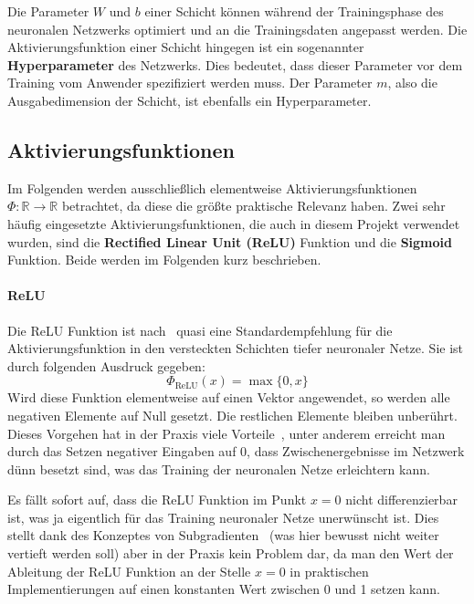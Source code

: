 Die Parameter $W$ und $b$ einer Schicht k\"onnen w\"ahrend der Trainingsphase
des neuronalen Netzwerks optimiert und an die Trainingsdaten
angepasst werden.
Die Aktivierungsfunktion einer Schicht hingegen ist ein sogenannter
\textbf{Hyperparameter} des Netzwerks. Dies bedeutet, dass dieser
Parameter vor dem Training vom Anwender spezifiziert werden muss.
Der Parameter $m$, also die Ausgabedimension der Schicht, ist ebenfalls
ein Hyperparameter.

\subsection{Aktivierungsfunktionen}

Im Folgenden werden ausschlie{\ss}lich elementweise Aktivierungsfunktionen
$\Phi: \mathbb{R} \rightarrow \mathbb{R}$ betrachtet,
da diese die gr\"o{\ss}te praktische Relevanz haben.
Zwei sehr h\"aufig eingesetzte Aktivierungsfunktionen, die auch in diesem
Projekt verwendet wurden, sind die \textbf{Rectified Linear Unit (ReLU)}
Funktion und die \textbf{Sigmoid} Funktion.
Beide werden im Folgenden kurz beschrieben.

\paragraph{ReLU}

Die ReLU Funktion ist nach~\cite{glorot} quasi eine
Standardempfehlung f\"ur die Aktivierungsfunktion in den
versteckten Schichten tiefer neuronaler Netze.
Sie ist durch folgenden Ausdruck gegeben:
\begin{equation*}
    \Phi_\text{ReLU}(x) = \max \{ 0, x \}
\end{equation*}
Wird diese Funktion elementweise auf einen Vektor angewendet, so werden
alle negativen Elemente auf Null gesetzt. Die restlichen Elemente bleiben
unber\"uhrt.
Dieses Vorgehen hat in der Praxis viele Vorteile~\cite{glorot}, unter
anderem erreicht man durch das Setzen negativer Eingaben auf 0,
dass Zwischenergebnisse im Netzwerk d\"unn besetzt sind, was das Training
der neuronalen Netze erleichtern kann.

Es f\"allt sofort auf, dass die ReLU Funktion im Punkt $x=0$ nicht
differenzierbar ist, was ja eigentlich f\"ur das Training neuronaler
Netze unerw\"unscht ist.
Dies stellt dank des Konzeptes von Subgradienten~\cite{understanding_ml}
(was hier bewusst nicht weiter vertieft werden soll)
aber in der Praxis kein Problem dar, da man den Wert der Ableitung der ReLU Funktion
an der Stelle $x=0$ in praktischen Implementierungen auf einen konstanten
Wert zwischen 0 und 1 setzen kann.

